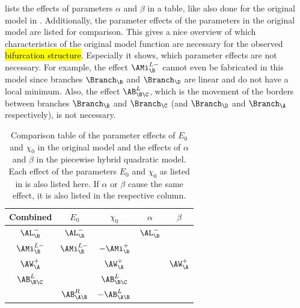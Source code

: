  lists the effects of parameters $\alpha$ and $\beta$ in a table, like also done for the original model in .
Additionally, the parameter effects of the parameters in the original model are listed for comparison.
This gives a nice overview of which characteristics of the original model function are necessary for the observed \hl{bifurcation structure}.
Especially it shows, which parameter effects are not necessary.
For example, the effect $\AMi_{\B}^{L-}$ cannot even be fabricated in this model since branches $\Branch_\B$ and $\Branch_\D$ are linear and do not have a local minimum.
Also, the effect $\AB_{\B\C}^L$, which is the movement of the borders between branches $\Branch_\B$ and $\Branch_\C$ (and $\Branch_\D$ and $\Branch_\A$ respectively), is not necessary.

\begin{table}
	\centering
	\begin{tabular}{|c||c|c||c|c|} \hline
		Combined         & $E_0$            & $\chi_0$          & $\alpha$     & $\beta$        \\ \hline \hline
		$\AL_{\B}^{-}$   & $\AL_{\B}^{-}$   &                   & $\AL_{\B}^-$ &                \\ \hline
		$\AMi_{\B}^{L-}$ & $\AMi_{\B}^{L-}$ & $-\AMi_{\B}^{+}$  &              &                \\ \hline
		$\AW_{\A}^{+}$   &                  & $\AW_{\A}^{+}$    &              & $\AW_{\A}^{+}$ \\ \hline \hline
		$\AB_{\B\C}^{L}$ &                  & $\AB_{\B\C}^{L}$  &              &                \\ \hline
		                 & $\AB_{\A\B}^{R}$ & $-\AB_{\A\B}^{L}$ &              &                \\ \hline
	\end{tabular}
	\caption[Comparison table of parameter effects in the piecewise hybrid quadratic model and the original model]{
		Comparison table of the parameter effects of $E_0$ and $\chi_0$ in the original model and the effects of $\alpha$ and $\beta$ in the piecewise hybrid quadratic model.
		Each effect of the parameters $E_0$ and $\chi_0$ as listed in  is also listed here.
		If $\alpha$ or $\beta$ cause the same effect, it is also listed in the respective column.
	}
	\label{table:setup.arch.paramfx}
\end{table}
